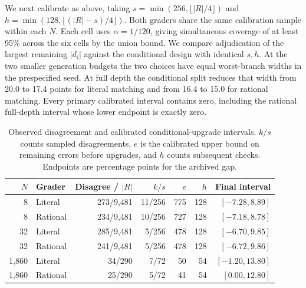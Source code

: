 \documentclass[10pt,letterpaper]{article}
\begin{document}
We next calibrate as above, taking $s=\min(256,\lfloor |R|/4\rfloor)$ and $h=\min(128,\lfloor(|R|-s)/4\rfloor)$. Both graders share the same calibration sample within each $N$. Each cell uses $\alpha=1/120$, giving simultaneous coverage of at least 95\% across the six cells by the union bound. We compare adjudication of the largest remaining $|d_i|$ against the conditional design with identical $s,h$. At the two smaller generation budgets the two choices have equal worst-branch widths in the prespecified seed. At full depth the conditional split reduces that width from 20.0 to 17.4 points for literal matching and from 16.4 to 15.0 for rational matching. Every primary calibrated interval contains zero, including the rational full-depth interval whose lower endpoint is exactly zero.
\begin{table}[!ht]\centering\small
\caption{Observed disagreement and calibrated conditional-upgrade intervals. $k/s$ counts sampled disagreements, $e$ is the calibrated upper bound on remaining errors before upgrades, and $h$ counts subsequent checks. Endpoints are percentage points for the archived gap.}\label{tab:proxies}
\begin{tabular}{rlrrrrr}\toprule
$N$ & Grader & Disagree / $|R|$ & $k/s$ & $e$ & $h$ & Final interval\\\midrule
8 & Literal & 273/9,481 & 11/256 & 775 & 128 & $[-7.28,8.89]$\\
8 & Rational & 234/9,481 & 10/256 & 727 & 128 & $[-7.18,8.78]$\\
32 & Literal & 285/9,481 & 5/256 & 478 & 128 & $[-6.70,9.85]$\\
32 & Rational & 241/9,481 & 5/256 & 478 & 128 & $[-6.72,9.86]$\\
1,860 & Literal & 34/290 & 7/72 & 50 & 54 & $[-1.20,13.80]$\\
1,860 & Rational & 25/290 & 5/72 & 41 & 54 & $[0.00,12.80]$\\
\bottomrule\end{tabular}
\end{table}
\end{document}
